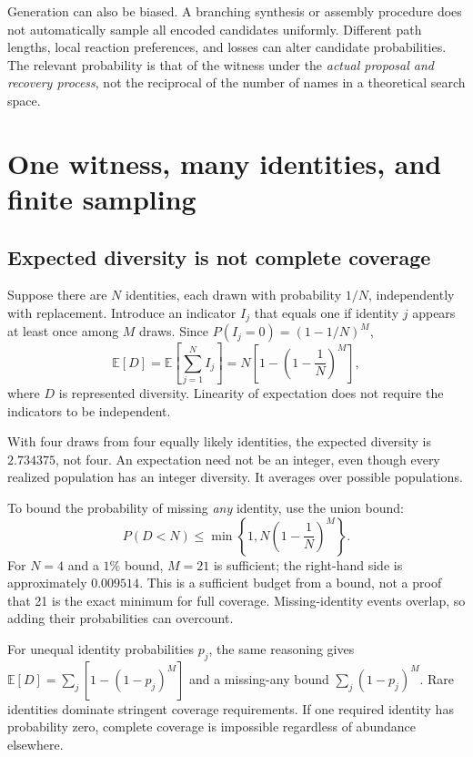 Generation can also be biased. A branching synthesis or assembly procedure does not automatically sample all encoded candidates uniformly. Different path lengths, local reaction preferences, and losses can alter candidate probabilities. The relevant probability is that of the witness under the \emph{actual proposal and recovery process}, not the reciprocal of the number of names in a theoretical search space.

\section{One witness, many identities, and finite sampling}

\subsection{Expected diversity is not complete coverage}

Suppose there are $N$ identities, each drawn with probability $1/N$, independently with replacement. Introduce an indicator $I_j$ that equals one if identity $j$ appears at least once among $M$ draws. Since $P(I_j=0)=(1-1/N)^M$,
\begin{equation}
\mathbb E[D]=\mathbb E\!\left[\sum_{j=1}^{N}I_j\right]
=N\left[1-\left(1-\frac1N\right)^M\right], \label{eq:diversity}
\end{equation}
where $D$ is represented diversity. Linearity of expectation does not require the indicators to be independent.

With four draws from four equally likely identities, the expected diversity is $2.734375$, not four. An expectation need not be an integer, even though every realized population has an integer diversity. It averages over possible populations.

To bound the probability of missing \emph{any} identity, use the union bound:
\begin{equation}
P(D<N)\leq \min\!\left\{1,N\left(1-\frac1N\right)^M\right\}.
\label{eq:union}
\end{equation}
For $N=4$ and a $1\%$ bound, $M=21$ is sufficient; the right-hand side is approximately $0.009514$. This is a sufficient budget from a bound, not a proof that 21 is the exact minimum for full coverage. Missing-identity events overlap, so adding their probabilities can overcount.

For unequal identity probabilities $p_j$, the same reasoning gives $\mathbb E[D]=\sum_j[1-(1-p_j)^M]$ and a missing-any bound $\sum_j(1-p_j)^M$. Rare identities dominate stringent coverage requirements. If one required identity has probability zero, complete coverage is impossible regardless of abundance elsewhere.

